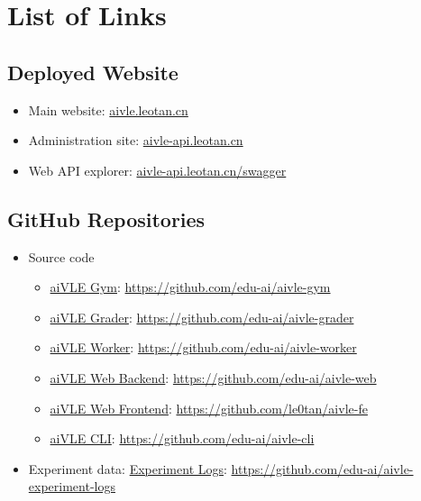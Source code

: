 \chapter{List of Links}
\label{appendix:links}

\section{Deployed Website}
\begin{itemize}
    \item Main website: \href{https://aivle.leotan.cn/}{aivle.leotan.cn}
    \item Administration site: \href{https://aivle-api.leotan.cn/api/v1/}{aivle-api.leotan.cn}
    \item Web API explorer: \href{https://aivle-api.leotan.cn/swagger/}{aivle-api.leotan.cn/swagger}
\end{itemize}

\section{GitHub Repositories}
\label{as:links-source_code}
\begin{itemize}
    \item Source code
    \begin{itemize}
        \item \href{https://github.com/edu-ai/aivle-gym}{aiVLE Gym}: \href{https://github.com/edu-ai/aivle-gym}{https://github.com/edu-ai/aivle-gym}
        \item \href{https://github.com/edu-ai/aivle-grader}{aiVLE Grader}: \href{https://github.com/edu-ai/aivle-grader}{https://github.com/edu-ai/aivle-grader}
        \item \href{https://github.com/edu-ai/aivle-worker}{aiVLE Worker}: \href{https://github.com/edu-ai/aivle-worker}{https://github.com/edu-ai/aivle-worker}
        \item \href{https://github.com/edu-ai/aivle-web}{aiVLE Web Backend}: \href{https://github.com/edu-ai/aivle-web}{https://github.com/edu-ai/aivle-web}
        \item \href{https://github.com/le0tan/aivle-fe}{aiVLE Web Frontend}: \href{https://github.com/le0tan/aivle-fe}{https://github.com/le0tan/aivle-fe}
        \item \href{https://github.com/edu-ai/aivle-cli}{aiVLE CLI}: \href{https://github.com/edu-ai/aivle-cli}{https://github.com/edu-ai/aivle-cli}
    \end{itemize}
    \item Experiment data: \href{https://github.com/edu-ai/aivle-experiment-logs}{Experiment Logs}: \href{https://github.com/edu-ai/aivle-experiment-logs}{https://github.com/edu-ai/aivle-experiment-logs}
\end{itemize}

